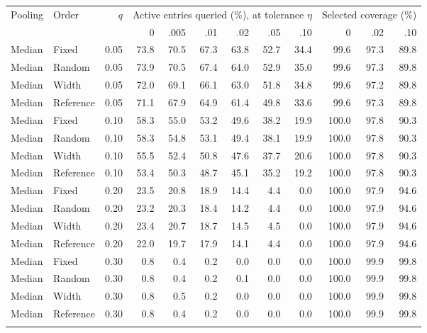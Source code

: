 \begin{table}[t]
\centering\small\setlength{\tabcolsep}{3pt}
\begin{tabular}{llrrrrrrrrrr}
\toprule
Pooling & Order & $q$ & \multicolumn{6}{c}{Active entries queried (\%), at tolerance $\eta$} & \multicolumn{3}{c}{Selected coverage (\%)} \\
\cmidrule(lr){4-9}\cmidrule(lr){10-12}
 & & & 0 & .005 & .01 & .02 & .05 & .10 & 0 & .02 & .10 \\
\midrule
Median & Fixed & 0.05 & 73.8 & 70.5 & 67.3 & 63.8 & 52.7 & 34.4 & 99.6 & 97.3 & 89.8 \\
Median & Random & 0.05 & 73.9 & 70.5 & 67.4 & 64.0 & 52.9 & 35.0 & 99.6 & 97.3 & 89.8 \\
Median & Width & 0.05 & 72.0 & 69.1 & 66.1 & 63.0 & 51.8 & 34.8 & 99.6 & 97.2 & 89.8 \\
Median & Reference & 0.05 & 71.1 & 67.9 & 64.9 & 61.4 & 49.8 & 33.6 & 99.6 & 97.3 & 89.8 \\
\addlinespace
Median & Fixed & 0.10 & 58.3 & 55.0 & 53.2 & 49.6 & 38.2 & 19.9 & 100.0 & 97.8 & 90.3 \\
Median & Random & 0.10 & 58.3 & 54.8 & 53.1 & 49.4 & 38.1 & 19.9 & 100.0 & 97.8 & 90.3 \\
Median & Width & 0.10 & 55.5 & 52.4 & 50.8 & 47.6 & 37.7 & 20.6 & 100.0 & 97.8 & 90.3 \\
Median & Reference & 0.10 & 53.4 & 50.3 & 48.7 & 45.1 & 35.2 & 19.2 & 100.0 & 97.8 & 90.3 \\
\addlinespace
Median & Fixed & 0.20 & 23.5 & 20.8 & 18.9 & 14.4 & 4.4 & 0.0 & 100.0 & 97.9 & 94.6 \\
Median & Random & 0.20 & 23.2 & 20.3 & 18.4 & 14.2 & 4.4 & 0.0 & 100.0 & 97.9 & 94.6 \\
Median & Width & 0.20 & 23.4 & 20.7 & 18.7 & 14.5 & 4.5 & 0.0 & 100.0 & 97.9 & 94.6 \\
Median & Reference & 0.20 & 22.0 & 19.7 & 17.9 & 14.1 & 4.4 & 0.0 & 100.0 & 97.9 & 94.6 \\
\addlinespace
Median & Fixed & 0.30 & 0.8 & 0.4 & 0.2 & 0.0 & 0.0 & 0.0 & 100.0 & 99.9 & 99.8 \\
Median & Random & 0.30 & 0.8 & 0.4 & 0.2 & 0.1 & 0.0 & 0.0 & 100.0 & 99.9 & 99.8 \\
Median & Width & 0.30 & 0.8 & 0.5 & 0.2 & 0.0 & 0.0 & 0.0 & 100.0 & 99.9 & 99.8 \\
Median & Reference & 0.30 & 0.8 & 0.4 & 0.2 & 0.0 & 0.0 & 0.0 & 100.0 & 99.9 & 99.8 \\
\addlinespace

\end{tabular}
\end{table}
